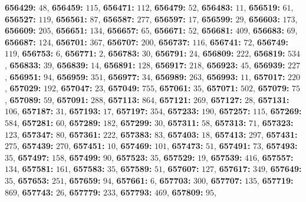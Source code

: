 \textsf{\bfseries 656429:} $48$, \textsf{\bfseries 656459:} $115$, \textsf{\bfseries 656471:} $112$, \textsf{\bfseries 656479:} $52$, \textsf{\bfseries 656483:} $11$, \textsf{\bfseries 656519:} $61$, \textsf{\bfseries 656527:} $119$, \textsf{\bfseries 656561:} $87$, \textsf{\bfseries 656587:} $277$, \textsf{\bfseries 656597:} $17$, \textsf{\bfseries 656599:} $29$, \textsf{\bfseries 656603:} $173$, \textsf{\bfseries 656609:} $205$, \textsf{\bfseries 656651:} $134$, \textsf{\bfseries 656657:} $65$, \textsf{\bfseries 656671:} $52$, \textsf{\bfseries 656681:} $409$, \textsf{\bfseries 656683:} $69$, \textsf{\bfseries 656687:} $124$, \textsf{\bfseries 656701:} $367$, \textsf{\bfseries 656707:} $200$, \textsf{\bfseries 656737:} $116$, \textsf{\bfseries 656741:} $72$, \textsf{\bfseries 656749:} $119$, \textsf{\bfseries 656753:} $6$, \textsf{\bfseries 656771:} $2$, \textsf{\bfseries 656783:} $30$, \textsf{\bfseries 656791:} $24$, \textsf{\bfseries 656809:} $222$, \textsf{\bfseries 656819:} $534$, \textsf{\bfseries 656833:} $39$, \textsf{\bfseries 656839:} $14$, \textsf{\bfseries 656891:} $128$, \textsf{\bfseries 656917:} $218$, \textsf{\bfseries 656923:} $45$, \textsf{\bfseries 656939:} $227$, \textsf{\bfseries 656951:} $94$, \textsf{\bfseries 656959:} $351$, \textsf{\bfseries 656977:} $34$, \textsf{\bfseries 656989:} $263$, \textsf{\bfseries 656993:} $11$, \textsf{\bfseries 657017:} $220$, \textsf{\bfseries 657029:} $192$, \textsf{\bfseries 657047:} $23$, \textsf{\bfseries 657049:} $755$, \textsf{\bfseries 657061:} $35$, \textsf{\bfseries 657071:} $502$, \textsf{\bfseries 657079:} $75$, \textsf{\bfseries 657089:} $59$, \textsf{\bfseries 657091:} $288$, \textsf{\bfseries 657113:} $864$, \textsf{\bfseries 657121:} $269$, \textsf{\bfseries 657127:} $28$, \textsf{\bfseries 657131:} $106$, \textsf{\bfseries 657187:} $31$, \textsf{\bfseries 657193:} $17$, \textsf{\bfseries 657197:} $354$, \textsf{\bfseries 657233:} $190$, \textsf{\bfseries 657257:} $115$, \textsf{\bfseries 657269:} $584$, \textsf{\bfseries 657281:} $60$, \textsf{\bfseries 657289:} $182$, \textsf{\bfseries 657299:} $30$, \textsf{\bfseries 657311:} $58$, \textsf{\bfseries 657313:} $71$, \textsf{\bfseries 657323:} $123$, \textsf{\bfseries 657347:} $80$, \textsf{\bfseries 657361:} $222$, \textsf{\bfseries 657383:} $83$, \textsf{\bfseries 657403:} $18$, \textsf{\bfseries 657413:} $297$, \textsf{\bfseries 657431:} $275$, \textsf{\bfseries 657439:} $270$, \textsf{\bfseries 657451:} $10$, \textsf{\bfseries 657469:} $101$, \textsf{\bfseries 657473:} $51$, \textsf{\bfseries 657491:} $73$, \textsf{\bfseries 657493:} $35$, \textsf{\bfseries 657497:} $158$, \textsf{\bfseries 657499:} $90$, \textsf{\bfseries 657523:} $35$, \textsf{\bfseries 657529:} $19$, \textsf{\bfseries 657539:} $416$, \textsf{\bfseries 657557:} $134$, \textsf{\bfseries 657581:} $161$, \textsf{\bfseries 657583:} $35$, \textsf{\bfseries 657589:} $51$, \textsf{\bfseries 657607:} $127$, \textsf{\bfseries 657617:} $349$, \textsf{\bfseries 657649:} $35$, \textsf{\bfseries 657653:} $251$, \textsf{\bfseries 657659:} $94$, \textsf{\bfseries 657661:} $6$, \textsf{\bfseries 657703:} $300$, \textsf{\bfseries 657707:} $135$, \textsf{\bfseries 657719:} $869$, \textsf{\bfseries 657743:} $26$, \textsf{\bfseries 657779:} $233$, \textsf{\bfseries 657793:} $469$, \textsf{\bfseries 657809:} $95$, 
